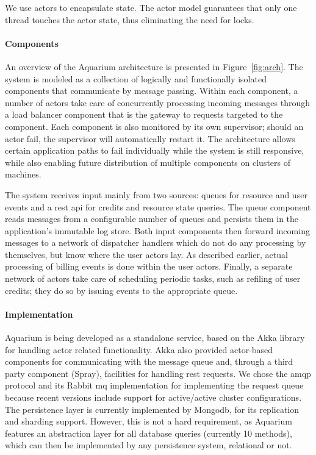 We use actors to encapsulate state. The actor model guarantees that
only one thread touches the actor state, thus eliminating the need for
locks.

\paragraph{Components} An overview of the Aquarium architecture is
presented in Figure~\ref{fig:arch}. The system is modeled as a
collection of logically and functionally isolated components that
communicate by message passing. Within each component, a number of
actors take care of concurrently processing incoming messages through
a load balancer component that is the gateway to requests targeted to
the component. Each component is also monitored by its own supervisor;
should an actor fail, the supervisor will automatically restart it.
The architecture allows certain application paths to fail individually
while the system is still responsive, while also enabling future
distribution of multiple components on clusters of machines.

The system receives input mainly from two sources: queues for
resource and user events and a {\sc rest api} for credits and resource
state queries. The queue component reads messages from a configurable
number of queues and persists them in the application's immutable log
store. Both input components then forward incoming messages to a
network of dispatcher handlers which do not do any processing by
themselves, but know where the user actors lay. As described earlier,
actual processing of billing events is done within the user actors.
Finally, a separate network of actors take care of scheduling periodic
tasks, such as refiling of user credits; they do so by issuing events
to the appropriate queue.

\paragraph{Implementation}

Aquarium is being developed as a standalone service, based on the Akka
library for handling actor related functionality. Akka also provided
actor-based components for communicating with the message queue and,
through a third party component (Spray), facilities for handling {\sc
  rest} requests. We chose the {\sc amqp} protocol and its Rabbit{\sc
  mq} implementation for implementing the request queue because recent
versions include support for active/active cluster configurations. The
persistence layer is currently implemented by Mongo{\sc db}, for its
replication and sharding support. However, this is not a hard
requirement, as Aquarium features an abstraction layer for all
database queries (currently 10 methods), which can then be implemented
by any persistence system, relational or not.
